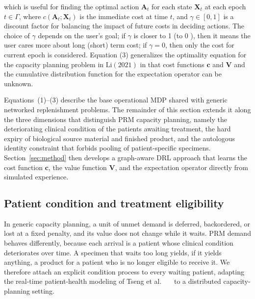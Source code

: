 \documentclass[preprint,review,12pt,nonatbib]{elsarticle}
\providecommand{\DIFadd}[1]{{\protect\color{blue}#1}} %
\providecommand{\DIFdel}[1]{} %
\providecommand{\DIFaddbegin}{} %
\providecommand{\DIFdelbegin}{} %
\providecommand{\DIFdelend}{} %
\providecommand{\DIFscaledelfig}{0.5}
\newlength{\DIFdelgraphicswidth} %
\newlength{\DIFdelgraphicsheight} %
\providecommand{\DIFaddincludegraphics}[2][]{{\color{blue}\fbox{\DIFOincludegraphics[#1]{#2}}}} %
\providecommand{\DIFdelincludegraphics}[2][]{%
\sbox{\DIFdelgraphicsbox}{\DIFOincludegraphics[#1]{#2}}%
\settoboxwidth{\DIFdelgraphicswidth}{\DIFdelgraphicsbox} %
\settoboxtotalheight{\DIFdelgraphicsheight}{\DIFdelgraphicsbox} %
\scalebox{\DIFscaledelfig}{%
\parbox[b]{\DIFdelgraphicswidth}{\usebox{\DIFdelgraphicsbox}\\[-\baselineskip] \rule{\DIFdelgraphicswidth}{0em}}\llap{\resizebox{\DIFdelgraphicswidth}{\DIFdelgraphicsheight}{%
\setlength{\unitlength}{\DIFdelgraphicswidth}%
\begin{picture}(1,1)%
\thicklines\linethickness{2pt} %
{\color[rgb]{1,0,0}\put(0,0){\framebox(1,1){}}}%
{\color[rgb]{1,0,0}\put(0,0){\line( 1,1){1}}}%
{\color[rgb]{1,0,0}\put(0,1){\line(1,-1){1}}}%
\end{picture}%
}\hspace*{3pt}}} %
} %
\DeclareRobustCommand{\DIFaddbegin}{\DIFOaddbegin \let\includegraphics\DIFaddincludegraphics} %
\DeclareRobustCommand{\DIFdelbegin}{\DIFOdelbegin \let\includegraphics\DIFdelincludegraphics} %
\DeclareRobustCommand{\DIFdelend}{\DIFOaddend \let\includegraphics\DIFOincludegraphics} %
\begin{document}
which is useful for finding the optimal action $\mathbf{A}_{t}$ for each state $\mathbf{X}_{t}$ at each epoch $t \in \Gamma$, where $c\left(\mathbf{A}_{t} ; \mathbf{X}_{t}\right)$ is the immediate cost at time $t$, and $\gamma \in[0,1]$ is a discount factor for balancing the impact of future costs in deciding actions. The choice of $\gamma$ depends on the user's goal; if $\gamma$ is closer to 1 (to 0 ), then it means the user cares more about long (short) term cost; if $\gamma=0$, then only the cost for current epoch is considered. Equation (3) generalizes the optimality equation for the capacity planning problem in $\mathrm{Li}(2021)$ \cite{Li2023} in that cost functions \textit{$\mathbf{c}$} and $\mathbf{V}$ and the cumulative distribution function for the expectation operator can be unknown.
\DIFdelbegin \DIFdel{In the next section we will propose a DRL approach based on the DDPG algorithm for determining the solution of Equation (3) by learning the cost functions }\textit{\DIFdel{$\mathbf{c}$}} %
\DIFdel{and $\mathbf{V}$ and the cumulative distribution function for the expectation operator using data-driven approaches. }\DIFdelend 

\DIFaddbegin \DIFadd{Equations~(1)--(3) describe the base operational MDP shared with generic networked replenishment problems. The remainder of this section extends it along the three dimensions that distinguish PRM capacity planning, namely the deteriorating clinical condition of the patients awaiting treatment, the hard expiry of biological source material and finished product, and the autologous identity constraint that forbids pooling of patient-specific specimens. Section~\ref{sec:method} then develops a graph-aware DRL approach that learns the cost function $\mathbf{c}$, the value function $\mathbf{V}$, and the expectation operator directly from simulated experience.
}

\subsection{\DIFadd{Patient condition and treatment eligibility}}
\label{sec:problem-patient}

\DIFadd{In generic capacity planning, a unit of unmet demand is deferred, backordered, or lost at a fixed penalty, and its value does not change while it waits. PRM demand behaves differently, because each arrival is a patient whose clinical condition deteriorates over time. A specimen that waits too long yields, if it yields anything, a product for a patient who is no longer eligible to receive it. We therefore attach an explicit condition process to every waiting patient, adapting the real-time patient-health modeling of Tseng et al.~\mbox{%
\cite{Tseng2024PatientHealth} }\hskip0pt%
to a distributed capacity-planning setting.
}
\end{document}
